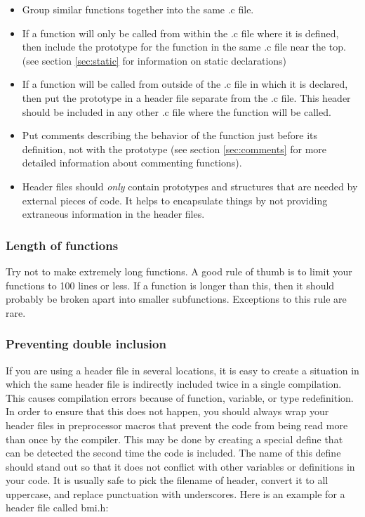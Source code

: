 \documentclass[11pt, letterpaper]{article}
\begin{document}
\begin{itemize}
	\item Group similar functions together into the same .c file.  
	\item If a function will only be called from within the .c file where
	it is defined, then include the prototype for the function in the
	same .c file near the top.  (see section \ref{sec:static} for
	information on static declarations)
	\item If a function will be called from outside of the .c file in
	which it is declared, then put the prototype in a header file
	separate from the .c file.  This header should be included in any
	other .c file where the function will be called.
	\item Put comments describing the behavior of the function just
	before its definition, not with the prototype  (see section
	\ref{sec:comments} for more detailed information about commenting
	functions).
	\item Header files should \emph{only} contain prototypes and structures
	that are needed by external pieces of code.  It helps to encapsulate things by not providing extraneous information in the
	header files.
\end{itemize}

\subsubsection{Length of functions}

Try not to make extremely long functions.  A good rule of thumb is to
limit your functions to 100 lines or less.  If a function is longer than
this, then it should probably be broken apart into smaller subfunctions.
Exceptions to this rule are rare.

\subsubsection{Preventing double inclusion}

If you are using a header file in several locations, it is easy to
create a situation in which the same header file is indirectly included
twice in a single compilation.  This causes compilation errors because
of function, variable, or type redefinition.  In order to ensure that
this does not happen, you should always wrap your header files in
preprocessor macros that prevent the code from being read more than once
by the compiler.  This may be done by creating a special define that can
be detected the second time the code is included.  The name of this
define should stand out so that it does not conflict with other
variables
or definitions in your code.  It is usually safe to pick the filename of
header, convert it to all uppercase, and replace punctuation with
underscores.  Here is an example for a header file called bmi.h:
\end{document}
